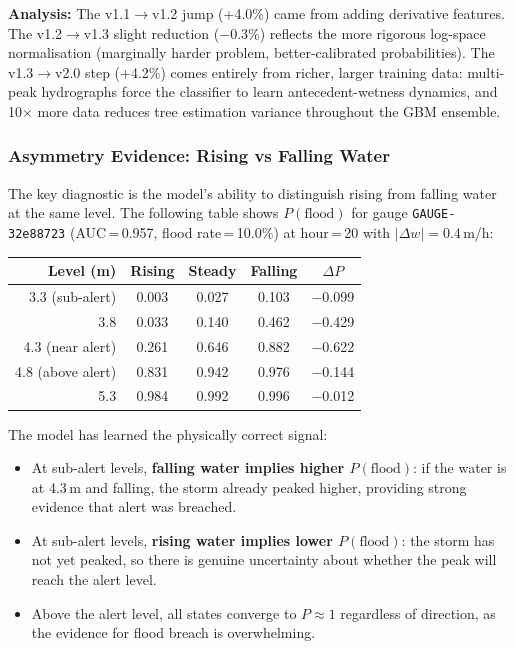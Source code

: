 \documentclass[11pt,a4paper]{article}
\begin{document}
\noindent\textbf{Analysis:} The v1.1$\to$v1.2 jump (+4.0\%) came from adding derivative
features. The v1.2$\to$v1.3 slight reduction ($-$0.3\%) reflects the more rigorous
log-space normalisation (marginally harder problem, better-calibrated probabilities).
The v1.3$\to$v2.0 step (+4.2\%) comes entirely from richer, larger training data:
multi-peak hydrographs force the classifier to learn antecedent-wetness dynamics,
and 10$\times$ more data reduces tree estimation variance throughout the GBM ensemble.

\subsubsection{Asymmetry Evidence: Rising vs Falling Water}
The key diagnostic is the model's ability to distinguish rising from falling water
at the same level. The following table shows $P(\text{flood})$ for gauge
\texttt{GAUGE-32e88723} (AUC\,=\,0.957, flood rate\,=\,10.0\%) at hour\,=\,20
with $|\Delta w| = 0.4$\,m/h:

\begin{center}
\begin{tabular}{rcccc}
\toprule
\textbf{Level (m)} & \textbf{Rising} & \textbf{Steady} & \textbf{Falling}
    & \textbf{$\Delta P$} \\
\midrule
3.3 (sub-alert) & 0.003 & 0.027 & 0.103 & $-$0.099 \\
3.8 & 0.033 & 0.140 & 0.462 & $-$0.429 \\
4.3 (near alert) & 0.261 & 0.646 & 0.882 & $-$0.622 \\
4.8 (above alert) & 0.831 & 0.942 & 0.976 & $-$0.144 \\
5.3 & 0.984 & 0.992 & 0.996 & $-$0.012 \\
\bottomrule
\end{tabular}
\end{center}

\noindent The model has learned the physically correct signal:
\begin{itemize}[nosep]
    \item At sub-alert levels, \textbf{falling water implies higher $P(\text{flood})$}:
          if the water is at 4.3\,m and falling, the storm already peaked higher,
          providing strong evidence that alert was breached.
    \item At sub-alert levels, \textbf{rising water implies lower $P(\text{flood})$}:
          the storm has not yet peaked, so there is genuine uncertainty about
          whether the peak will reach the alert level.
    \item Above the alert level, all states converge to $P \approx 1$ regardless
          of direction, as the evidence for flood breach is overwhelming.
\end{itemize}
\end{document}
